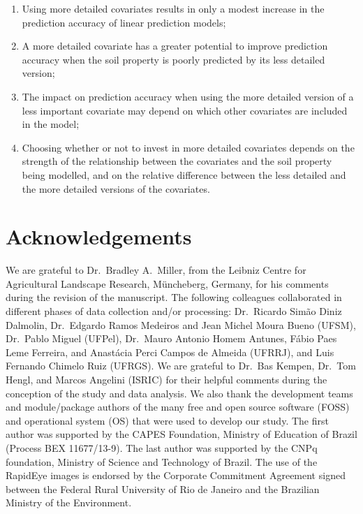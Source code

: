 \begin{enumerate}
 \item Using more detailed covariates results in only a modest increase in the prediction accuracy of linear 
 prediction models;
 
 \item A more detailed covariate has a greater potential to improve prediction accuracy when the soil property
 is poorly predicted by its less detailed version;
 
 \item The impact on prediction accuracy when using the more detailed version of a less important covariate 
 may depend on which other covariates are included in the model;
 
 \item Choosing whether or not to invest in more detailed covariates depends on the strength of the 
 relationship between the covariates and the soil property being modelled, and on the relative difference 
 between the less detailed and the more detailed versions of the covariates.
\end{enumerate}

\section*{Acknowledgements}

We are grateful to Dr.~Bradley A.~Miller, from the Leibniz Centre for Agricultural Landscape Research, 
M\"uncheberg, Germany, for his comments during the revision of the manuscript. The following colleagues 
collaborated in different phases of data collection and/or processing: Dr.~Ricardo Simão Diniz Dalmolin, 
Dr.~Edgardo Ramos Medeiros and Jean Michel Moura Bueno (UFSM), Dr.~Pablo Miguel (UFPel), Dr.~Mauro Antonio 
Homem Antunes, Fábio Paes Leme Ferreira, and Anastácia Perci Campos de Almeida (UFRRJ), and Luis Fernando 
Chimelo Ruiz (UFRGS). We are grateful to Dr.~Bas Kempen, Dr.~Tom Hengl, and Marcos Angelini (ISRIC) for their 
helpful comments during the conception of the study and data analysis. We also thank the development teams and 
module/package authors of the many free and open source software (FOSS) and operational system (OS) that were 
used to develop our study. The first author was supported by the CAPES Foundation, Ministry of Education of 
Brazil (Process BEX 11677/13-9). The last author was supported by the CNPq foundation, Ministry of Science and 
Technology of Brazil. The use of the RapidEye images is endorsed by the Corporate Commitment Agreement signed 
between the Federal Rural University of Rio de Janeiro and the Brazilian Ministry of the Environment.
